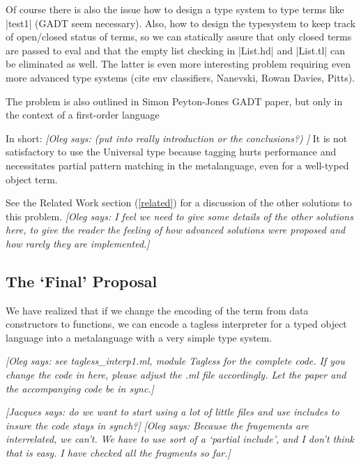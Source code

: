\documentclass[preprint]{sigplanconf}
\newcommand{\jacques}[1]{{\it [Jacques says: #1]}}
\newcommand{\oleg}[1]{{\it [Oleg says: #1]}}
\begin{document}
Of course there is also the issue how to design a type system to type
terms like |test1| (GADT seem necessary). Also, how to design the
typesystem to keep track of open/closed status of terms, so we can
statically assure that only closed terms are passed to eval and that
the empty list checking in |List.hd| and |List.tl| can be eliminated
as well. The latter is even more interesting problem requiring even
more advanced type systems (cite env classifiers, Nanevski, Rowan
Davies, Pitts).

The problem is also outlined in Simon Peyton-Jones GADT paper, but
only in the context of a first-order language

In short: \oleg{ (put into really introduction or the conclusions?) }
It is not satisfactory
to use the Universal type because tagging hurts performance and
necessitates partial pattern matching in the metalanguage, even for a
well-typed object term.  



See the Related Work section (\ref{related}) for a discussion of the other
solutions to this problem.
\oleg{I feel we need to give some details of the other solutions here, 
to give the reader the feeling of
how advanced solutions were proposed and how rarely they are
implemented.}


\subsection{The `Final' Proposal}\label{ourapproach}

We have realized that if we change the encoding of the term from data
constructors to functions, we can encode a tagless interpreter for a
typed object language into a metalanguage with a very simple type system.

\oleg{see tagless\_interp1.ml, module Tagless for the complete code.
If you change the code in here, please adjust the .ml file
accordingly. Let the paper and the accompanying code be in sync.}

\jacques{do we want to start using a lot of little files and
use includes to insure the code stays in synch?}
\oleg{Because the fragements are interrelated, we can't. We have to
  use sort of a `partial include', and I don't think that is easy. I
  have checked all the fragments so far.}
\end{document}
